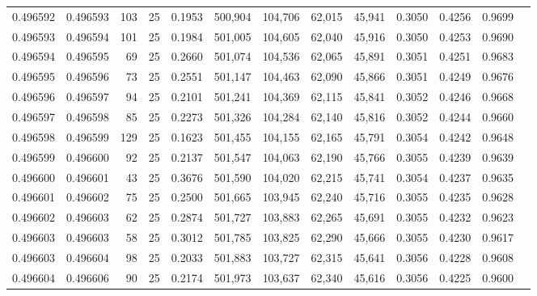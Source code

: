 \begin{tabular}{rrrrrrrrrrrrr}
0.496592 & 0.496593 &   103 &  25 &                                     0.1953 & 500,904 & 104,706 &  62,015 &  45,941 & 0.3050 & 0.4256 & 0.9699 \\
0.496593 & 0.496594 &   101 &  25 &                                     0.1984 & 501,005 & 104,605 &  62,040 &  45,916 & 0.3050 & 0.4253 & 0.9690 \\
0.496594 & 0.496595 &    69 &  25 &                                     0.2660 & 501,074 & 104,536 &  62,065 &  45,891 & 0.3051 & 0.4251 & 0.9683 \\
0.496595 & 0.496596 &    73 &  25 &                                     0.2551 & 501,147 & 104,463 &  62,090 &  45,866 & 0.3051 & 0.4249 & 0.9676 \\
0.496596 & 0.496597 &    94 &  25 &                                     0.2101 & 501,241 & 104,369 &  62,115 &  45,841 & 0.3052 & 0.4246 & 0.9668 \\
0.496597 & 0.496598 &    85 &  25 &                                     0.2273 & 501,326 & 104,284 &  62,140 &  45,816 & 0.3052 & 0.4244 & 0.9660 \\
0.496598 & 0.496599 &   129 &  25 &                                     0.1623 & 501,455 & 104,155 &  62,165 &  45,791 & 0.3054 & 0.4242 & 0.9648 \\
0.496599 & 0.496600 &    92 &  25 &                                     0.2137 & 501,547 & 104,063 &  62,190 &  45,766 & 0.3055 & 0.4239 & 0.9639 \\
0.496600 & 0.496601 &    43 &  25 &                                     0.3676 & 501,590 & 104,020 &  62,215 &  45,741 & 0.3054 & 0.4237 & 0.9635 \\
0.496601 & 0.496602 &    75 &  25 &                                     0.2500 & 501,665 & 103,945 &  62,240 &  45,716 & 0.3055 & 0.4235 & 0.9628 \\
0.496602 & 0.496603 &    62 &  25 &                                     0.2874 & 501,727 & 103,883 &  62,265 &  45,691 & 0.3055 & 0.4232 & 0.9623 \\
0.496603 & 0.496603 &    58 &  25 &                                     0.3012 & 501,785 & 103,825 &  62,290 &  45,666 & 0.3055 & 0.4230 & 0.9617 \\
0.496603 & 0.496604 &    98 &  25 &                                     0.2033 & 501,883 & 103,727 &  62,315 &  45,641 & 0.3056 & 0.4228 & 0.9608 \\
0.496604 & 0.496606 &    90 &  25 &                                     0.2174 & 501,973 & 103,637 &  62,340 &  45,616 & 0.3056 & 0.4225 & 0.9600 \\

\end{tabular}
